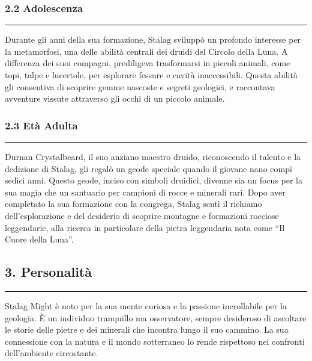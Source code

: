 \subsubsection{2.2 Adolescenza}\label{adolescenza}

\begin{center}\rule{0.5\linewidth}{0.5pt}\end{center}

Durante gli anni della sua formazione, Stalag sviluppò un profondo
interesse per la metamorfosi, una delle abilità centrali dei druidi del
Circolo della Luna. A differenza dei suoi compagni, prediligeva
trasformarsi in piccoli animali, come topi, talpe e lucertole, per
esplorare fessure e cavità inaccessibili. Questa abilità gli consentiva
di scoprire gemme nascoste e segreti geologici, e raccontava avventure
vissute attraverso gli occhi di un piccolo animale.

\subsubsection{2.3 Età Adulta}\label{etuxe0-adulta}

\begin{center}\rule{0.5\linewidth}{0.5pt}\end{center}

Durnan Crystalbeard, il suo anziano maestro druido, riconoscendo il
talento e la dedizione di Stalag, gli regalò un geode speciale quando il
giovane nano compì sedici anni. Questo geode, inciso con simboli
druidici, divenne sia un focus per la sua magia che un santuario per
campioni di rocce e minerali rari. Dopo aver completato la sua
formazione con la congrega, Stalag sentì il richiamo dell'esplorazione e
del desiderio di scoprire montagne e formazioni rocciose leggendarie,
alla ricerca in particolare della pietra leggendaria nota come ``Il
Cuore della Luna''.

\subsection{3. Personalità}\label{personalituxe0}

\begin{center}\rule{0.5\linewidth}{0.5pt}\end{center}

Stalag Might è noto per la sua mente curiosa e la passione incrollabile
per la geologia. È un individuo tranquillo ma osservatore, sempre
desideroso di ascoltare le storie delle pietre e dei minerali che
incontra lungo il suo cammino. La sua connessione con la natura e il
mondo sotterraneo lo rende rispettoso nei confronti dell'ambiente
circostante.

